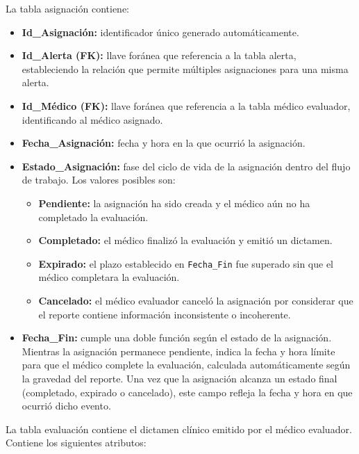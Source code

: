 La tabla asignación contiene:

\begin{itemize}
    \item \textbf{Id\_Asignación:} identificador único generado automáticamente.
    \item \textbf{Id\_Alerta (FK):} llave foránea que referencia a la tabla alerta, estableciendo la relación que permite múltiples asignaciones para una misma alerta.
    \item \textbf{Id\_Médico (FK):} llave foránea que referencia a la tabla médico evaluador, identificando al médico asignado.
    \item \textbf{Fecha\_Asignación:} fecha y hora en la que ocurrió la asignación.
    \item \textbf{Estado\_Asignación:} fase del ciclo de vida de la asignación dentro del flujo de trabajo. Los valores posibles son:
        \begin{itemize}
            \item \textbf{Pendiente:} la asignación ha sido creada y el médico aún no ha completado la evaluación.
            \item \textbf{Completado:} el médico finalizó la evaluación y emitió un dictamen.
            \item \textbf{Expirado:} el plazo establecido en \texttt{Fecha\_Fin} fue superado sin que el médico completara la evaluación.
            \item \textbf{Cancelado:} el médico evaluador canceló la asignación por considerar que el reporte contiene información inconsistente o incoherente.
        \end{itemize}
    \item \textbf{Fecha\_Fin:} cumple una doble función según el estado de la asignación. Mientras la asignación permanece pendiente, indica la fecha y hora límite para que el médico complete la evaluación, calculada automáticamente según la gravedad del reporte. Una vez que la asignación alcanza un estado final (completado, expirado o cancelado), este campo refleja la fecha y hora en que ocurrió dicho evento.
\end{itemize}

La tabla evaluación contiene el dictamen clínico emitido por el médico evaluador. Contiene los siguientes atributos:

